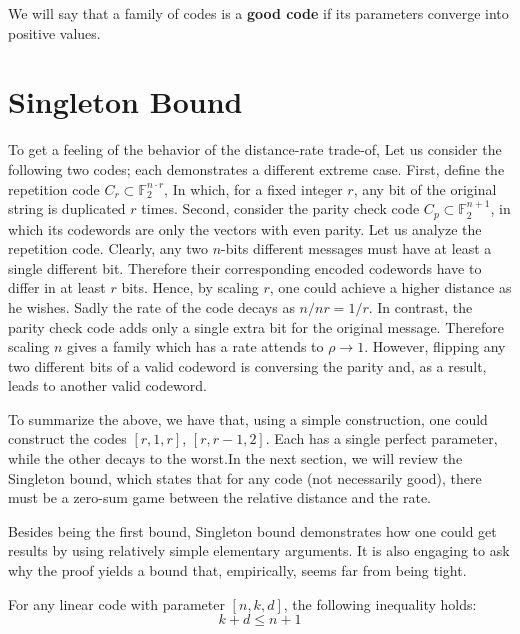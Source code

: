 \documentclass[12pt,a4paper]{article}
\begin{document}
  \begin{definition} \label{good-code} We will say that a family of codes is a \textbf{good code} if its parameters converge into positive values. 
  \end{definition}

  \section{Singleton Bound}  
  To get a feeling of the behavior of the distance-rate trade-of, Let us consider the following two codes; each demonstrates a different extreme case. First, define the repetition code $C_{r} \subset \mathbb{F}_{2}^{n \cdot r}$, In which, for a fixed integer $r$, any bit of the original string is duplicated $r$ times. Second, consider the parity check code $C_{p} \subset \mathbb{F}_{2}^{n+1}$, in which its codewords are only the vectors with even parity. Let us analyze the repetition code. Clearly, any two $n$-bits different messages must have at least a single different bit. Therefore their corresponding encoded codewords have to differ in at least $r$ bits. Hence, by scaling $r$, one could achieve a higher distance as he wishes. Sadly the rate of the code decays as $n/nr = 1/r$. In contrast, the parity check code adds only a single extra bit for the original message. Therefore scaling $n$ gives a family which has a rate attends to $\rho \rightarrow 1$. However, flipping any two different bits of a valid codeword is conversing the parity and, as a result, leads to another valid codeword.

  To summarize the above, we have that, using a simple construction, one could construct the codes $[r, 1, r]$, $[r, r-1, 2]$. Each has a single perfect parameter, while the other decays to the worst.\ifdefined\LDPCLTC In the next section, we will review the Singleton bound, which states that for any code (not necessarily good), there must be a zero-sum game between the relative distance and the rate.
\fi %

  Besides being the first bound, Singleton bound demonstrates how one could get results by using relatively simple elementary arguments. It is also engaging to ask why the proof yields a bound that, empirically, seems far from being tight.
  \begin{theorem*}\label{theorem*:Sing}  For any linear code with parameter $[n,k,d]$, the following inequality holds:
  \begin{equation*}
    k+ d \le n + 1
  \end{equation*} 
  \end{theorem*}
\end{document}
